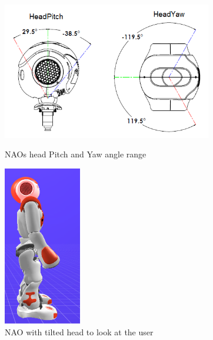 \begin{figure}	 	
	\begin{minipage}
		{.6
		\textwidth}  	
		\includegraphics[height=60mm]{figures/content/nao-head.png} \caption{NAOs head Pitch and Yaw angle range} \label{fg:nao:head} 
	\end{minipage}
	\begin{minipage}
		{.3 
		\textwidth}  
		\centering
		\includegraphics[height=70mm]{figures/content/nao-head-stand.png} \caption{NAO with tilted head to look at the user} \label{fg:nao:head:stand} 
	\end{minipage}	
\end{figure}


